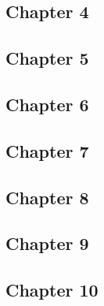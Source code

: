 \subsection*{Chapter 4}

\begin{itemize}
    \pybullet 
\end{itemize}

\subsection*{Chapter 5}

\begin{itemize}
    \pybullet {}
    \pybullet {}
\end{itemize}

\subsection*{Chapter 6}

\begin{itemize}
    \pybullet 
\end{itemize}

\subsection*{Chapter 7}

\begin{itemize}
    \pybullet 
\end{itemize}

\subsection*{Chapter 8}

\begin{itemize}
    \pybullet 
\end{itemize}

\subsection*{Chapter 9}

\begin{itemize}
    \pybullet 
\end{itemize}

\subsection*{Chapter 10}

